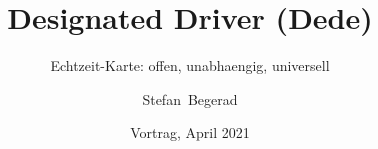 


\usepackage{hyperref}

\usepackage{colortbl}

\usepackage{listings}

\title[Dede]%
{Designated Driver (Dede)}

\subtitle{Echtzeit-Karte: offen, unabhaengig, universell}

\author[Begerad]%
{Stefan~Begerad}

\date[April 2021]%
{Vortrag, April 2021}

